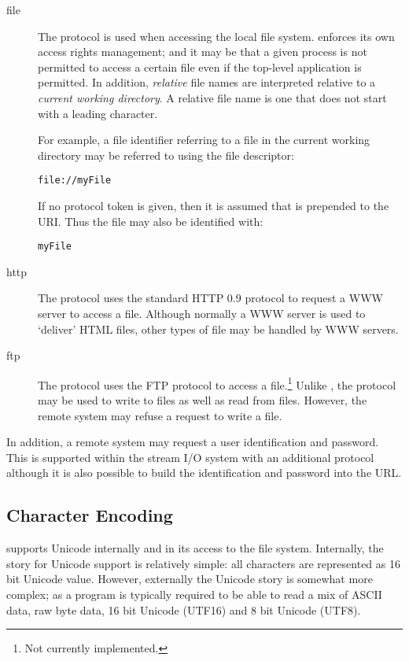 \begin{description}
\item[file]
The  protocol is used when accessing the local file system. \go enforces its own access rights management; and it may be that a given process is not permitted to access a certain file even if the top-level \go application is permitted. In addition, \emph{relative} file names are interpreted relative to a \emph{current working directory}. A relative file name is one that does not start with a leading  character.

For example, a  file identifier referring to a file  in the current working directory may be referred to using the file descriptor:
\begin{alltt}
file://myFile
\end{alltt}

If no protocol token is given, then it is assumed that  is pre\-pended to the URI. Thus the  file may also be identified with:
\begin{alltt}
myFile
\end{alltt}

\item[http]
The  protocol uses the standard HTTP 0.9 protocol to request a WWW server to access a file. Although normally a WWW server is used to `deliver' HTML files, other types of file may be handled by WWW servers.

\item[ftp]
The  protocol uses the FTP protocol to access a file.\footnote{Not currently implemented.} Unlike , the  protocol may be used to write to files as well as read from files. However, the remote system may refuse a request to write a file.
\end{description}

In addition, a remote system may request a user identification and password. This is supported within the stream I/O system with an additional protocol although it is also possible to build the identification and password into the URL.

\subsection{Character Encoding}
\label{io:encoding}
\go supports Unicode internally and in its access to the file system. Internally, the story for Unicode support is relatively simple: all characters are represented as 16 bit Unicode value. However, externally the Unicode story is somewhat more complex; as a \go program is typically required to be able to read a mix of ASCII data, raw byte data, 16 bit Unicode (UTF16) and 8 bit Unicode (UTF8).

